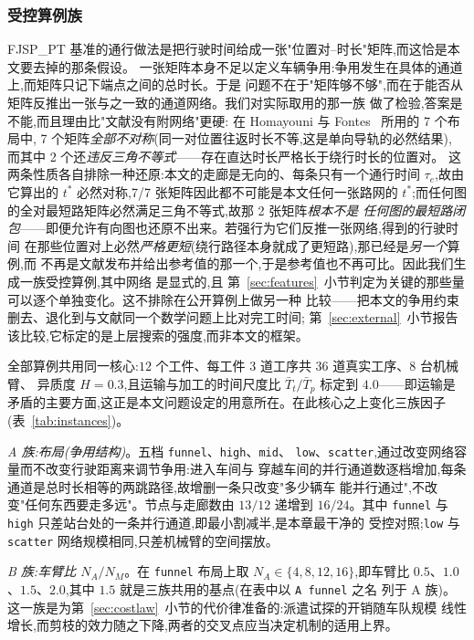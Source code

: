 \documentclass[manuscript,screen,review]{acmart}
\newcommand{\PubNLayout}{7}
\newcommand{\PubNLayoutAsym}{7}           %
\newcommand{\PubNLayoutBad}{2}            %
\begin{document}
\subsubsection{受控算例族}
FJSP\_PT 基准的通行做法是把行驶时间给成一张"位置对--时长"矩阵,而这恰是本文要去掉的那条假设。
一张矩阵本身不足以定义车辆争用:争用发生在具体的通道上,而矩阵只记下端点之间的总时长。于是
问题不在于"矩阵够不够",而在于能否从矩阵反推出一张与之一致的通道网络。我们对实际取用的那一族
做了检验,答案是不能,而且理由比"文献没有附网络"更硬:
在 Homayouni 与 Fontes~\cite{homayouni2021production} 所用的 \PubNLayout{} 个布局中,
\PubNLayoutAsym{} 个矩阵\emph{全部不对称}(同一对位置往返时长不等,这是单向导轨的必然结果),
而其中 \PubNLayoutBad{} 个还\emph{违反三角不等式}——存在直达时长严格长于绕行时长的位置对。
这两条性质各自排除一种还原:本文的走廊是无向的、每条只有一个通行时间 $\tau_e$,故由它算出的
$t^{*}$ 必然对称,\PubNLayoutAsym{}/\PubNLayout{} 张矩阵因此都不可能是本文任何一张路网的
$t^{*}$;而任何图的全对最短路矩阵必然满足三角不等式,故那 \PubNLayoutBad{} 张矩阵\emph{根本不是
任何图的最短路闭包}——即便允许有向图也还原不出来。若强行为它们反推一张网络,得到的行驶时间
在那些位置对上必然\emph{严格更短}(绕行路径本身就成了更短路),那已经是\emph{另一个}算例,而
不再是文献发布并给出参考值的那一个,于是参考值也不再可比。因此我们生成一族受控算例,其中网络
是显式的,且
第~\ref{sec:features}~小节判定为关键的那些量可以逐个单独变化。这不排除在公开算例上做另一种
比较——把本文的争用约束删去、退化到与文献同一个数学问题上比对完工时间;
第~\ref{sec:external}~小节报告该比较,它标定的是上层搜索的强度,而非本文的框架。

全部算例共用同一核心:$12$ 个工件、每工件 $3$ 道工序共 $36$ 道真实工序、$8$ 台机械臂、
异质度 $H=0.3$,且运输与加工的时间尺度比 $\bar{T}_t/\bar{T}_p$ 标定到 $4.0$——即运输是
矛盾的主要方面,这正是本文问题设定的用意所在。在此核心之上变化三族因子
(表~\ref{tab:instances})。

\emph{A 族:布局(争用结构)}。五档 \texttt{funnel}、\texttt{high}、\texttt{mid}、
\texttt{low}、\texttt{scatter},通过改变网络容量而不改变行驶距离来调节争用:进入车间与
穿越车间的并行通道数逐档增加,每条通道是总时长相等的两跳路径,故增删一条只改变"多少辆车
能并行通过",不改变"任何东西要走多远"。节点与走廊数由 $13/12$ 递增到 $16/24$。其中
\texttt{funnel} 与 \texttt{high} 只差站台处的一条并行通道,即最小割减半,是本章最干净的
受控对照;\texttt{low} 与 \texttt{scatter} 网络规模相同,只差机械臂的空间摆放。

\emph{B 族:车臂比 $N_A/N_M$}。在 \texttt{funnel} 布局上取 $N_A\in\{4,8,12,16\}$,即车臂比
$0.5$、$1.0$、$1.5$、$2.0$,其中 $1.5$ 就是三族共用的基点(在表中以 \texttt{A funnel} 之名
列于 A 族)。这一族是为第~\ref{sec:costlaw}~小节的代价律准备的:派遣试探的开销随车队规模
线性增长,而剪枝的效力随之下降,两者的交叉点应当决定机制的适用上界。
\end{document}

